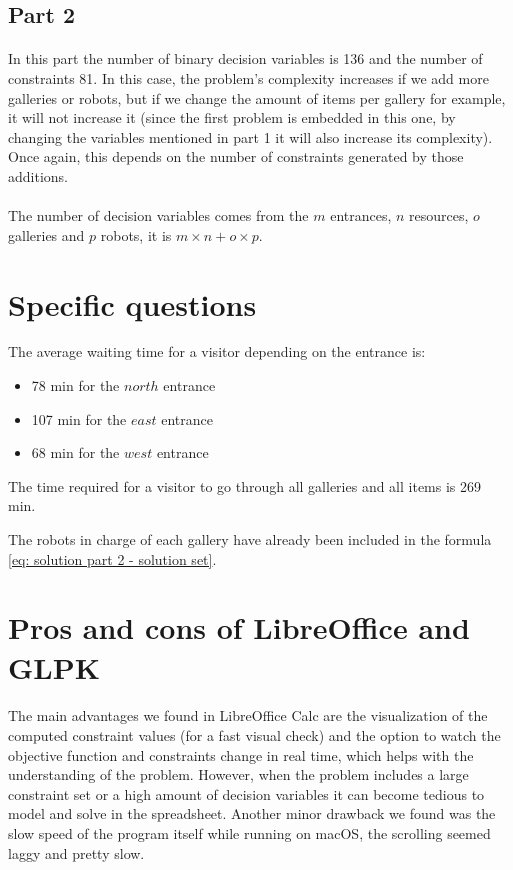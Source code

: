 \subsection{Part 2}

\paragraph{}
In this part the number of binary decision variables is 136 and the number of constraints 81. In this case, the problem's complexity increases if we add more galleries or robots, but if we change the amount of items per gallery for example, it will not increase it (since the first problem is embedded in this one, by changing the variables mentioned in part 1 it will also increase its complexity). Once again, this depends on the number of constraints generated by those additions.

\paragraph{}
The number of decision variables comes from the $m$ entrances, $n$ resources, $o$ galleries and $p$ robots, it is $m \times n + o \times p$. 


\section{Specific questions}
The average waiting time for a visitor depending on the entrance is:
\begin{itemize}
    \item[] 78 min for the $north$ entrance
    \item[] 107 min for the $east$ entrance
    \item[] 68 min for the $west$ entrance
\end{itemize}

The time required for a visitor to go through all galleries and all items is 269 min.

The robots in charge of each gallery have already been included in the formula \ref{eq: solution part 2 - solution set}.



\section{Pros and cons of LibreOffice and GLPK}

\paragraph{}
The main advantages we found in LibreOffice Calc are the visualization of the computed constraint values (for a fast visual check) and the option to watch the objective function and constraints change in real time, which helps with the understanding of the problem. However, when the problem includes a large constraint set or a high amount of decision variables it can become tedious to model and solve in the spreadsheet. Another minor drawback we found was the slow speed of the program itself while running on macOS, the scrolling seemed laggy and pretty slow.

